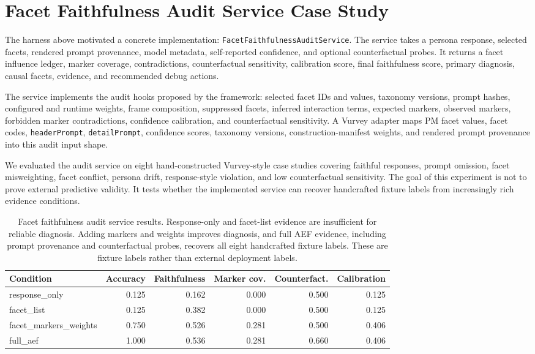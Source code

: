\documentclass[10pt,a4paper]{article}
\begin{document}
\section{Facet Faithfulness Audit Service Case Study}
The harness above motivated a concrete implementation: \texttt{FacetFaithfulnessAuditService}. The service takes a persona response, selected facets, rendered prompt provenance, model metadata, self-reported confidence, and optional counterfactual probes. It returns a facet influence ledger, marker coverage, contradictions, counterfactual sensitivity, calibration score, final faithfulness score, primary diagnosis, causal facets, evidence, and recommended debug actions.

The service implements the audit hooks proposed by the framework: selected facet IDs and values, taxonomy versions, prompt hashes, configured and runtime weights, frame composition, suppressed facets, inferred interaction terms, expected markers, observed markers, forbidden marker contradictions, confidence calibration, and counterfactual sensitivity. A Vurvey adapter maps PM facet values, facet codes, \texttt{headerPrompt}, \texttt{detailPrompt}, confidence scores, taxonomy versions, construction-manifest weights, and rendered prompt provenance into this audit input shape.

We evaluated the audit service on eight hand-constructed Vurvey-style case studies covering faithful responses, prompt omission, facet misweighting, facet conflict, persona drift, response-style violation, and low counterfactual sensitivity. The goal of this experiment is not to prove external predictive validity. It tests whether the implemented service can recover handcrafted fixture labels from increasingly rich evidence conditions.

\begin{table}[h]
\centering
\caption{Facet faithfulness audit service results. Response-only and facet-list evidence are insufficient for reliable diagnosis. Adding markers and weights improves diagnosis, and full AEF evidence, including prompt provenance and counterfactual probes, recovers all eight handcrafted fixture labels. These are fixture labels rather than external deployment labels.}
\label{tab:facet-audit-service-results}
\begin{tabular}{lrrrrr}
\toprule
Condition & Accuracy & Faithfulness & Marker cov. & Counterfact. & Calibration \\
\midrule
response\_only & 0.125 & 0.162 & 0.000 & 0.500 & 0.125 \\
facet\_list & 0.125 & 0.382 & 0.000 & 0.500 & 0.125 \\
facet\_markers\_weights & 0.750 & 0.526 & 0.281 & 0.500 & 0.406 \\
full\_aef & 1.000 & 0.536 & 0.281 & 0.660 & 0.406 \\
\bottomrule
\end{tabular}
\end{table}
\end{document}
